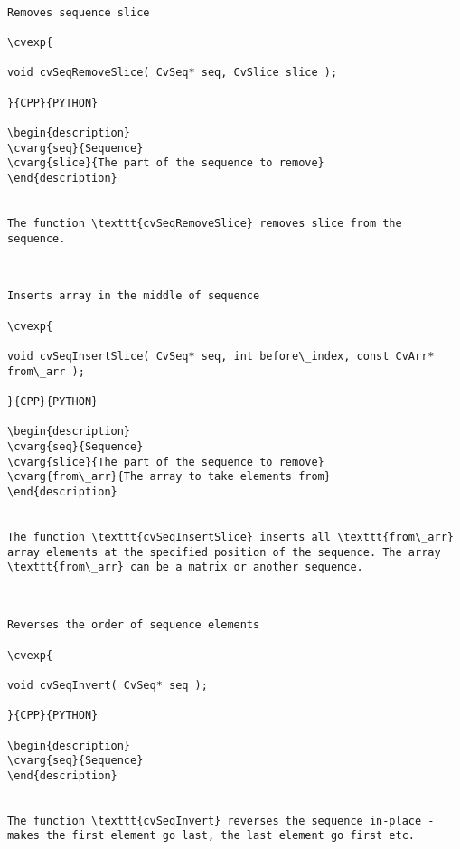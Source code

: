 \begin{verbatim}

Removes sequence slice

\cvexp{

void cvSeqRemoveSlice( CvSeq* seq, CvSlice slice );

}{CPP}{PYTHON}

\begin{description}
\cvarg{seq}{Sequence}
\cvarg{slice}{The part of the sequence to remove}
\end{description}


The function \texttt{cvSeqRemoveSlice} removes slice from the sequence.


\end{verbatim}
\begin{verbatim}

Inserts array in the middle of sequence

\cvexp{

void cvSeqInsertSlice( CvSeq* seq, int before\_index, const CvArr* from\_arr );

}{CPP}{PYTHON}

\begin{description}
\cvarg{seq}{Sequence}
\cvarg{slice}{The part of the sequence to remove}
\cvarg{from\_arr}{The array to take elements from}
\end{description}


The function \texttt{cvSeqInsertSlice} inserts all \texttt{from\_arr} array elements at the specified position of the sequence. The array \texttt{from\_arr} can be a matrix or another sequence.


\end{verbatim}
\begin{verbatim}

Reverses the order of sequence elements

\cvexp{

void cvSeqInvert( CvSeq* seq );

}{CPP}{PYTHON}

\begin{description}
\cvarg{seq}{Sequence}
\end{description}


The function \texttt{cvSeqInvert} reverses the sequence in-place - makes the first element go last, the last element go first etc.


\end{verbatim}
